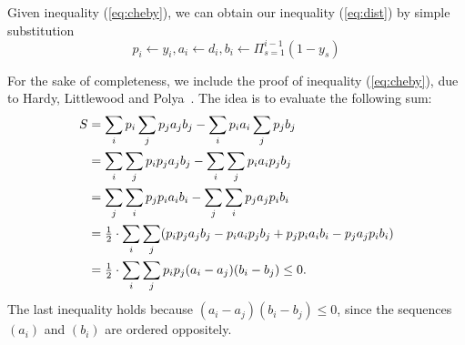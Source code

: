 \documentclass[11pt]{article}
\begin{document}
Given inequality (\ref{eq:cheby}), we can obtain our inequality
(\ref{eq:dist}) by simple substitution
%
\begin{equation}
  p_i \leftarrow y_i, a_i \leftarrow d_i, b_i \leftarrow
  \Pi_{s=1}^{i-1} (1-y_s)
\end{equation}

For the sake of completeness, we include the proof of inequality (\ref{eq:cheby}), 
due to Hardy, Littlewood and Polya~\cite{HardyLP88}. The idea is to evaluate the 
following sum:
%
\begin{align*}
  S &= \sum_i p_i \sum_j p_j a_j b_j - \sum_i p_i a_i \sum_j p_j b_j
	\\
  & = \sum_i \sum_j p_i p_j a_j b_j - \sum_i \sum_j p_i a_i p_j b_j
	\\
  & = \sum_j \sum_i p_j p_i a_i b_i - \sum_j \sum _i p_j a_j p_i b_i
	\\
	&= {\mbox{$\frac{1}{2}$}} \cdot \sum_i \sum_j (p_i p_j a_j b_j - p_i a_i p_j b_j + p_j p_i a_i
  							b_i - p_j a_j p_i b_i)
\\
  &= {\mbox{$\frac{1}{2}$}} \cdot \sum_i \sum_j p_i p_j (a_i - a_j)(b_i - b_j) \leq 0.
\end{align*}
The last inequality holds because $(a_i-a_j)(b_i-b_j) \leq 0$, since the sequences
$(a_i)$ and $(b_i)$ are ordered oppositely.
\end{document}
